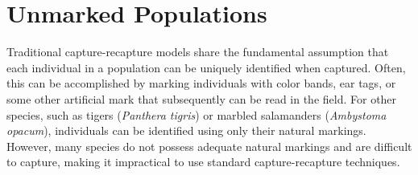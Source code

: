 \chapter{Unmarked Populations}
\label{chapt.scr-unmarked}

\vspace{0.3cm}


Traditional capture-recapture models share the fundamental
assumption that each individual in a population can be uniquely
identified when captured. Often, this can be accomplished
by marking individuals with color bands, ear tags, or some other
artificial mark that subsequently can be  read in the field. For other
species, such as tigers (\textit{Panthera tigris}) or
marbled salamanders (\textit{Ambystoma opacum}),
individuals can be identified
using only their natural markings. However, many species
do not possess adequate natural markings and are
difficult to capture, making it impractical to use standard
capture-recapture techniques.

